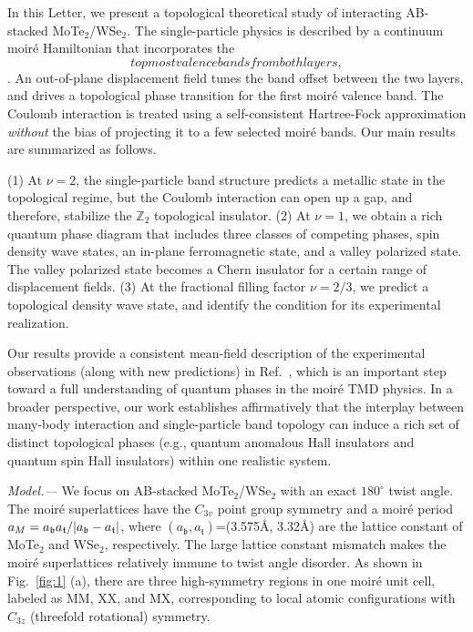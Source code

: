 \documentclass[aps,prl,twocolumn,superscriptaddress,longbibliography]{revtex4-2}
\begin{document}
In this Letter, we present a topological theoretical study of interacting AB-stacked MoTe$_2$/WSe$_2$. The single-particle physics is described by a continuum moir\'e Hamiltonian that incorporates the 
\begin{equation}
    topmost valence bands from both layers,
\end{equation}. An out-of-plane displacement field tunes the band offset between the two layers, and drives a topological phase transition for the first moir\'e valence band. The Coulomb interaction is treated using a self-consistent Hartree-Fock approximation {\it without} the bias of projecting it to a few selected moir\'e bands. Our main results are summarized as follows.
{(1) At $\nu=2$, the single-particle band structure predicts a metallic state in the topological regime, but the Coulomb interaction can open up a gap, and therefore, stabilize the $\mathbb{Z}_2$ topological insulator. 
(2) At $\nu=1$, we obtain a rich quantum phase diagram that includes three classes of competing phases, spin density wave states, an in-plane ferromagnetic state, and a valley polarized state. The valley polarized state becomes a Chern insulator for a certain range of displacement fields. 
(3) At the fractional filling factor $\nu=2/3$, we predict a topological density wave state, and identify the condition for its experimental realization.

Our results provide a consistent mean-field description of the experimental observations (along with new predictions) in Ref.~, which is an important step toward a full understanding of quantum phases in the moir\'e TMD physics. In a broader perspective, our work establishes affirmatively that the interplay between many-body interaction and single-particle band topology can induce a rich set of distinct topological phases (e.g., quantum anomalous Hall insulators and quantum spin Hall insulators) within one realistic system.}

\textit{Model.---}
We focus on AB-stacked MoTe$_2$/WSe$_2$ with an exact $180^\circ$ twist angle. The moir\'e superlattices have the $C_{3v}$ point group symmetry and a moir\'e period $a_M=a_{\mathfrak{b}}a_{\mathfrak{t}}/\abs{a_{\mathfrak{b}}-a_{\mathfrak{t}}}$, where $(a_{\mathfrak{b}},a_{\mathfrak{t}})$=(3.575\AA, 3.32\AA) are the lattice constant of MoTe$_2$ and WSe$_2$, respectively. The large lattice constant mismatch makes the moir\'e superlattices relatively immune to twist angle disorder. As shown in Fig.~\ref{fig:1} (a), there are three high-symmetry regions in one moir\'e unit cell, labeled as MM,  XX, and MX, corresponding to  local atomic configurations with $C_{3z}$ (threefold
rotational) symmetry.
\end{document}
